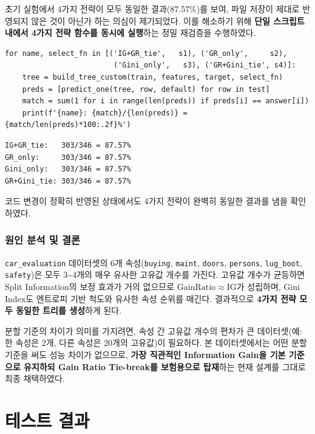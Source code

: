 \documentclass[12pt, a4paper]{article}
\begin{document}
\noindent 초기 실험에서 4가지 전략이 모두 동일한 결과(87.57\%)를 보여, 파일 저장이 제대로 반영되지 않은 것이 아닌가 하는 의심이 제기되었다. 이를 해소하기 위해 \textbf{단일 스크립트 내에서 4가지 전략 함수를 동시에 실행}하는 정밀 재검증을 수행하였다.

\begin{verbatim}
for name, select_fn in [('IG+GR_tie',   s1), ('GR_only',     s2),
                         ('Gini_only',   s3), ('GR+Gini_tie', s4)]:
    tree = build_tree_custom(train, features, target, select_fn)
    preds = [predict_one(tree, row, default) for row in test]
    match = sum(1 for i in range(len(preds)) if preds[i] == answer[i])
    print(f'{name}: {match}/{len(preds)} = {match/len(preds)*100:.2f}%')
\end{verbatim}

\begin{verbatim}
IG+GR_tie:   303/346 = 87.57%
GR_only:     303/346 = 87.57%
Gini_only:   303/346 = 87.57%
GR+Gini_tie: 303/346 = 87.57%
\end{verbatim}

코드 변경이 정확히 반영된 상태에서도 4가지 전략이 완벽히 동일한 결과를 냄을 확인하였다.

\subsubsection*{원인 분석 및 결론}

\texttt{car\_evaluation} 데이터셋의 6개 속성(\texttt{buying}, \texttt{maint}, \texttt{doors}, \texttt{persons}, \texttt{lug\_boot}, \texttt{safety})은 모두 3\textasciitilde 4개의 매우 유사한 고유값 개수를 가진다. 고유값 개수가 균등하면 Split Information의 보정 효과가 거의 없으므로 $\mathrm{GainRatio} \approx \mathrm{IG}$가 성립하며, Gini Index도 엔트로피 기반 척도와 유사한 속성 순위를 매긴다. 결과적으로 \textbf{4가지 전략 모두 동일한 트리를 생성}하게 된다.

분할 기준의 차이가 의미를 가지려면, 속성 간 고유값 개수의 편차가 큰 데이터셋(예: 한 속성은 2개, 다른 속성은 20개의 고유값)이 필요하다. 본 데이터셋에서는 어떤 분할 기준을 써도 성능 차이가 없으므로, \textbf{가장 직관적인 Information Gain을 기본 기준으로 유지하되 Gain Ratio Tie-break를 보험용으로 탑재}하는 현재 설계를 그대로 최종 채택하였다.


\section{테스트 결과}
\end{document}
